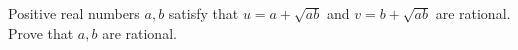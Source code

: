 Positive real numbers $a,b$ satisfy that $u=a+\sqrt{ab}$ and $v=b+\sqrt{ab}$ are rational. Prove that $a,b$ are rational.
